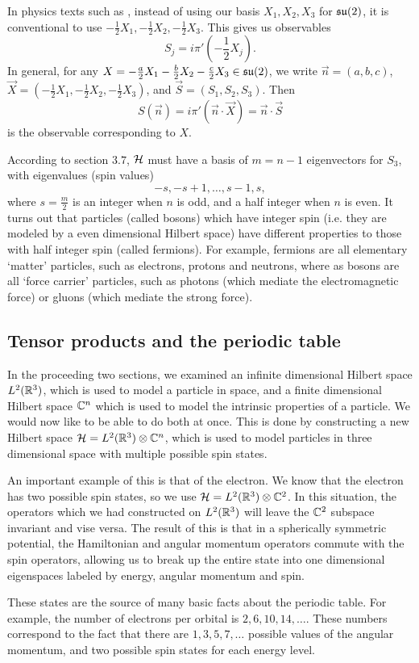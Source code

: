 \documentclass[a4paper]{article}
\begin{document}
In physics texts such as \cite{miller} \cite{woit}, instead of using our basis $X_1, X_2, X_3$ for $\mathfrak{su}(2)$, it is conventional to use $-\frac{1}{2}X_1, -\frac{1}{2}X_2, -\frac{1}{2}X_3$. This gives us observables 
$$S_j =i \pi'(-\frac{1}{2}X_j).$$ 
In general, for any $X = -\frac{a}{2}X_1 -\frac{b}{2} X_2 - \frac{c}{2} X_3 \in \mathfrak{su}(2)$, we write $\vec{n} = (a, b, c)$, $\vec{X} = (-\frac{1}{2}X_1, -\frac{1}{2}X_2, -\frac{1}{2}X_3)$, and $\vec{S} = (S_1, S_2, S_3)$. Then 
$$S(\vec{n}) = i\pi'(\vec{n} \cdot \vec{X}) = \vec{n} \cdot \vec{S}$$
is the observable corresponding to $X$. 

According to section $3.7$, $\mathcal{H}$ must have a basis of $m = n - 1$ eigenvectors for $S_3$, with eigenvalues (spin values)
$$-s,-s + 1, \hdots,s-1, s,$$
where $s = \frac{m}{2}$ is an integer when $n$ is odd, and a half integer when $n$ is even. It turns out \cite{woit} that particles (called bosons) which have integer spin (i.e. they are modeled by a even dimensional Hilbert space) have different properties to those with half integer spin (called fermions). For example, fermions are all elementary `matter' particles, such as electrons, protons and neutrons, where as bosons are all `force carrier' particles, such as photons (which mediate the electromagnetic force) or gluons (which mediate the strong force).

\subsection{Tensor products and the periodic table}
In the proceeding two sections, we examined an infinite dimensional Hilbert space $L^2(\mathbb{R}^3)$, which is used to model a particle in space, and a finite dimensional Hilbert space $\mathbb{C}^n$ which is used to model the intrinsic properties of a particle. We would now like to be able to do both at once. This is done by constructing a new Hilbert space $\mathcal{H} = L^2(\mathbb{R}^3) \otimes \mathbb{C}^n$, which is used to model particles in three dimensional space with multiple possible spin states. 

An important example of this is that of the electron. We know that the electron has two possible spin states, so we use $\mathcal{H} = L^2(\mathbb{R}^3) \otimes \mathbb{C}^2$. In this situation, the operators which we had constructed on $L^2(\mathbb{R}^3)$ will leave the $\mathbb{C}^2$ subspace invariant and vise versa. The result of this is that in a spherically symmetric potential, the Hamiltonian and angular momentum operators commute with the spin operators, allowing us to break up the entire state into one dimensional eigenspaces labeled by energy, angular momentum and spin. 

These states are the source of many basic facts about the periodic table. For example, the number of electrons per orbital is $2, 6, 10, 14, \hdots$. These numbers correspond to the fact that there are $1, 3, 5, 7, \hdots$ possible values of the angular momentum, and two possible spin states for each energy level.

\newpage
 

\end{document}
